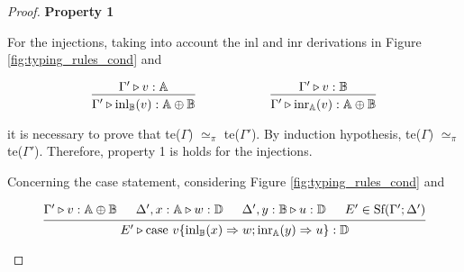 \documentclass[10pt,a4paper]{amsart}
\theoremstyle{definition}
\theoremstyle{definition}
\theoremstyle{definition}
\theoremstyle{definition}
\theoremstyle{definition}
\theoremstyle{definition}
\begin{document}
  \begin{proof}

    \textbf{Property 1}

    For the injections, taking into account the inl and inr derivations in Figure \ref{fig:typing_rules_cond} and

  \begin{figure} [H]
    \begin{equation*}
    \begin{aligned}
      &
      \begin{prooftree}
      \hypo{\Gamma' \triangleright v: \mathbb{A}}
      \infer1[]{\Gamma' \triangleright \text{inl}_{\mathbb{B}}(v): \mathbb{A} \oplus \mathbb{B}}
      \end{prooftree}
      \hspace{60pt}
      \begin{prooftree}
      \hypo{\Gamma' \triangleright v: \mathbb{B}}
      \infer1[]{\Gamma' \triangleright \text{inr}_{\mathbb{A}}(v): \mathbb{A} \oplus \mathbb{B}},
      \end{prooftree} \\
    \end{aligned}
    \end{equation*}
    \end{figure}
it is necessary to prove that te($\Gamma$) $\simeq_{\pi}$  te($\Gamma'$). By induction hypothesis, te($\Gamma$) $\simeq_{\pi}$  te($\Gamma'$). Therefore, property 1 is holds for the injections.


Concerning the case statement, considering  Figure \ref{fig:typing_rules_cond} and 
  
\begin{figure} [H]
    \begin{equation*}
    \begin{aligned}
      \begin{prooftree}
          \hypo{\Gamma' \triangleright v: \mathbb{A} \oplus \mathbb{B}}
          \hypo{\Delta', x: \mathbb{A} \triangleright w: \mathbb{D}}
          \hypo{\Delta', y: \mathbb{B} \triangleright u: \mathbb{D}}
          \hypo{E' \in \text{Sf}(\Gamma'; \Delta')}
          \infer4[]{E' \triangleright \text{case } v \{\text{inl}_{\mathbb{B}}(x) \Rightarrow w ; \text{inr}_{\mathbb{A}}(y) \Rightarrow u\}: \mathbb{D}}
          \end{prooftree}
    \end{aligned}
    \end{equation*}
    \end{figure}


\end{proof}
\end{document}

